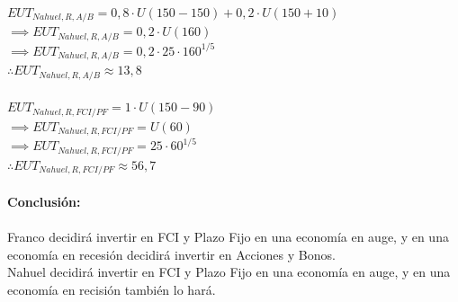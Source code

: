 \documentclass{article}
\begin{document}
      \(EUT_{Nahuel, R, A/B} = 0,8 \cdot U(150 - 150) + 0,2 \cdot U(150 + 10)\) \\
      \(\implies EUT_{Nahuel, R, A/B} = 0,2 \cdot U(160)\) \\
      \(\implies EUT_{Nahuel, R, A/B} = 0,2 \cdot 25 \cdot 160^{1/5}\) \\
      \(\therefore EUT_{Nahuel, R, A/B} \approx 13,8\) \\
      \\
      \(EUT_{Nahuel, R, FCI/PF} = 1 \cdot U(150 - 90)\) \\
      \(\implies EUT_{Nahuel, R, FCI/PF} = U(60)\) \\
      \(\implies EUT_{Nahuel, R, FCI/PF} = 25 \cdot 60^{1/5}\) \\
      \(\therefore EUT_{Nahuel, R, FCI/PF} \approx 56,7\)
      \\
      \\
      \textbf{Conclusión:}
      \\
      \\
      Franco decidirá invertir en FCI y Plazo Fijo en una economía en auge, y en una economía en recesión decidirá invertir en Acciones y Bonos. \\
      Nahuel decidirá invertir en FCI y Plazo Fijo en una economía en auge, y en una economía en recisión también lo hará.
\end{document}
